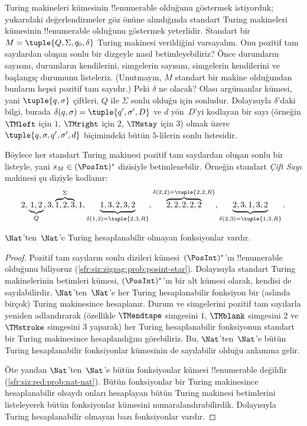 \documentclass[../../../include/open-logic-section]{subfiles}
\begin{document}
\begin{explain}
Turing makineleri kümesinin !!{enumerable} olduğunu göstermek istiyorduk;
yukarıdaki değerlendirmeler göz önüne alındığında standart Turing makineleri
kümesinin !!{enumerable} olduğunu göstermek yeterlidir. Standart bir
$M=\tuple{Q,\Sigma,q_0,\delta}$ Turing makinesi verildiğini varsayalım. Onu
pozitif tam sayılardan oluşan sonlu bir dizgeyle nasıl betimleyebiliriz? Önce
durumların sayısını, durumların kendilerini, simgelerin sayısını, simgelerin
kendilerini ve başlangıç durumunu listeleriz. (Unutmayın, $M$ standart bir
makine olduğundan bunların hepsi pozitif tam sayıdır.) Peki $\delta$ ne olacak?
Olası argümanlar kümesi, yani $\tuple{q,\sigma}$ çiftleri, $Q$ ile $\Sigma$
sonlu olduğu için sonludur. Dolayısıyla $\delta$'daki bilgi, burada
$\delta(q,\sigma)=\tuple{q',\sigma',D}$ ve $d$ yön~$D$'yi kodlayan bir sayı
(örneğin $\TMleft$ için $1$, $\TMright$ için $2$, $\TMstay$ için $3$) olmak
üzere $\tuple{q,\sigma,q',\sigma',d}$ biçimindeki bütün $5$-lilerin sonlu
listesidir.

Böylece her standart Turing makinesi pozitif tam sayılardan oluşan sonlu bir
listeyle, yani $s_M\in(\PosInt)^*$ dizisiyle betimlenebilir. Örneğin standart
\emph{Çift Sayı} makinesi şu diziyle kodlanır:
\[
2, \underbrace{1, 2}_Q, 3, \overbrace{1, 2, 3}^\Sigma, 1, \underbrace{1, 3, 2, 3, 2}_{\delta(1,3) = \tuple{2,3,R}}, 
\overbrace{2, 2, 2, 2, 2}^{\delta(2,2) = \tuple{2,2,R}},
\underbrace{2, 3, 1, 3, 2}_{\delta(2,3) = \tuple{1,3,R}}.
\]
\end{explain}

\begin{thm}
$\Nat$'ten~$\Nat$'e Turing hesaplanabilir olmayan fonksiyonlar vardır.
\end{thm}

\begin{proof}
Pozitif tam sayıların sonlu dizileri kümesi~$(\PosInt)^*$'ın !!{enumerable}
olduğunu biliyoruz (\cref{sfr:siz:zigzag:prob:posint-star}). Dolayısıyla
standart Turing makinelerinin betimleri kümesi, $(\PosInt)^*$'ın bir alt
kümesi olarak, kendisi de sayılabilirdir. $\Nat$'ten~$\Nat$'e her Turing
hesaplanabilir fonksiyon bir (aslında birçok) Turing makinesince hesaplanır.
Durum ve simgelerini pozitif tam sayılarla yeniden adlandırarak (özellikle
$\TMendtape$ simgesini $1$, $\TMblank$ simgesini $2$ ve $\TMstroke$ simgesini
$3$ yaparak) her Turing hesaplanabilir fonksiyonun standart bir Turing
makinesince hesaplandığını görebiliriz. Bu, $\Nat$'ten~$\Nat$'e bütün Turing
hesaplanabilir fonksiyonlar kümesinin de sayılabilir olduğu anlamına gelir.

Öte yandan $\Nat$'ten~$\Nat$'e bütün fonksiyonlar kümesi !!{enumerable}
değildir (\cref{sfr:siz:red:prob:nat-nat}). Bütün fonksiyonlar bir Turing
makinesince hesaplanabilir olsaydı onları hesaplayan bütün Turing makinesi
betimlerini listeleyerek bütün fonksiyonlar kümesini numaralandırabilirdik.
Dolayısıyla Turing hesaplanabilir olmayan bazı fonksiyonlar vardır.
\end{proof}
\end{document}
